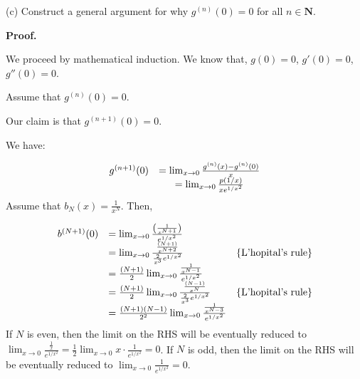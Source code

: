 \documentclass[10pt]{article}
\begin{document}
(c) Construct a general argument for why $\displaystyle g^{( n)}( 0) =0$ for all $\displaystyle n\in \mathbf{N}$.



\textbf{Proof.}



We proceed by mathematical induction. We know that, $\displaystyle g( 0) =0$, $\displaystyle g'( 0) =0$, $\displaystyle g''( 0) =0$. 



Assume that $\displaystyle g^{( n)}( 0) =0$.



Our claim is that $\displaystyle g^{( n+1)}( 0) =0$.



We have:


\begin{equation*}
\begin{array}{ c c }
g^{( n+1)}( 0) & =\lim _{x\rightarrow 0}\frac{g^{( n)}( x) -g^{( n)}( 0)}{x}\\
 & =\lim _{x\rightarrow 0}\frac{p( 1/x)}{xe^{1/x^{2}}}
\end{array}
\end{equation*}
Assume that $\displaystyle b_{N}( x) =\frac{1}{x^{N}}$. Then,


\begin{equation*}
\begin{array}{ c l c }
b^{( N+1)}( 0) & =\lim _{x\rightarrow 0}\frac{\left(\frac{1}{x^{N+1}}\right)}{e^{1/x^{2}}} & \\
 & =\lim _{x\rightarrow 0}\frac{\frac{( N+1)}{x^{N+2}}}{\frac{2}{x^{3}} e^{1/x^{2}}} & \left\{\text{L'hopital's rule}\right\}\\
 & =\frac{( N+1)}{2}\lim _{x\rightarrow 0}\frac{\frac{1}{x^{N-1}}}{e^{1/x^{2}}} & \\
 & =\frac{( N+1)}{2}\lim _{x\rightarrow 0}\frac{\frac{( N-1)}{x^{N}}}{\frac{2}{x^{3}} e^{1/x^{2}}} & \left\{\text{L'hopital's rule}\right\}\\
 & =\frac{( N+1)( N-1)}{2^{2}}\lim _{x\rightarrow 0}\frac{\frac{1}{x^{N-3}}}{e^{1/x^{2}}} & 
\end{array}
\end{equation*}
If $\displaystyle N$ is even, then the limit on the RHS will be eventually reduced to $\displaystyle \lim _{x\rightarrow 0}\frac{\frac{1}{x}}{e^{1/x^{2}}} =\frac{1}{2}\lim _{x\rightarrow 0} x\cdot \frac{1}{e^{1/x^{2}}} =0$. If $\displaystyle N$ is odd, then the limit on the RHS will be eventually reduced to $\displaystyle \lim _{x\rightarrow 0}\frac{1}{e^{1/x^{2}}} =0$. 
\end{document}
